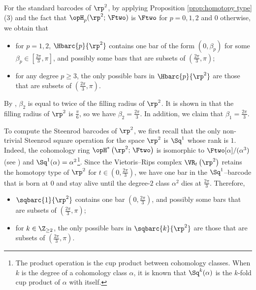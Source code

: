 \begin{example}
	For the standard barcodes of $\rp^2$, by applying Proposition \ref{prop:homotopy type} (3) and the fact that $\opH_p(\rp^2;\,\Ftwo)$ is $\Ftwo$ for $p=0,1,2$ and $0$ otherwise, we obtain that
	\begin{itemize}
		\item for $p=1,2$, $\Hbarc{p}{\rp^2}$ contains one bar of the form $(0,\beta_p)$ for some $\beta_p\in [\frac{2\pi}{3},\pi]$, and possibly some bars that are subsets of $(\frac{2\pi}{3},\pi)$; 
		\item for any degree $p\geq 3$, the only possible bars in $\Hbarc{p}{\rp^2}$ are those that are subsets of $(\frac{2\pi}{3},\pi)$.
	\end{itemize}
	 By \cite[Proposition 9.4]{lim2020vietoris}, $\beta_2$ is equal to twice of the filling radius of $\rp^2$. It is shown in \cite[Theorem 1]{katz1983filling} that the filling radius of $\rp^2$ is $\frac{\pi}{6}$, so we have $\beta_2=\frac{2\pi}{3}$. In addition, we claim that $\beta_1=\frac{2\pi}{3}$. 

	To compute the Steenrod barcodes of $\rp^2$, we first recall that the only non-trivial Steenrod square operation for the space $\rp^2$ is $\Sq^1$ whose rank is $1$. Indeed, the cohomology ring $\opH^*\left(\rp^2;\,\Ftwo\right)$ is isomorphic to $\Ftwo[\alpha]/(\alpha^3)$ (see \cite[Theorem 3.19]{hatcher2000}) and $\Sq^1(\alpha)=\alpha^2$\footnote{The product operation is the cup product between cohomology classes. When $k$ is the degree of a cohomology class $\alpha$, it is known that $\Sq^k(\alpha)$ is the $k$-fold cup product of $\alpha$ with itself.}. Since the Vietoris--Rips complex $\VR_t\left(\rp^2\right)$ retains the homotopy type of $\rp^2$ for $t\in (0,\frac{2\pi}{3})$, we have one bar in the $\Sq^1$--barcode that is born at $0$ and stay alive until the degree-$2$ class $\alpha^2$ dies at $\frac{2\pi}{3}$. Therefore,
	\begin{itemize}
		\item $\sqbarc{1}{\rp^2}$ contains one bar $(0,\frac{2\pi}{3})$, and possibly some bars that are subsets of $(\frac{2\pi}{3},\pi)$;
		\item for $k\in \Z_{\geq 2}$, the only possible bars in $\sqbarc{k}{\rp^2}$ are those that are subsets of $(\frac{2\pi}{3},\pi)$.
	\end{itemize}


\end{example}
